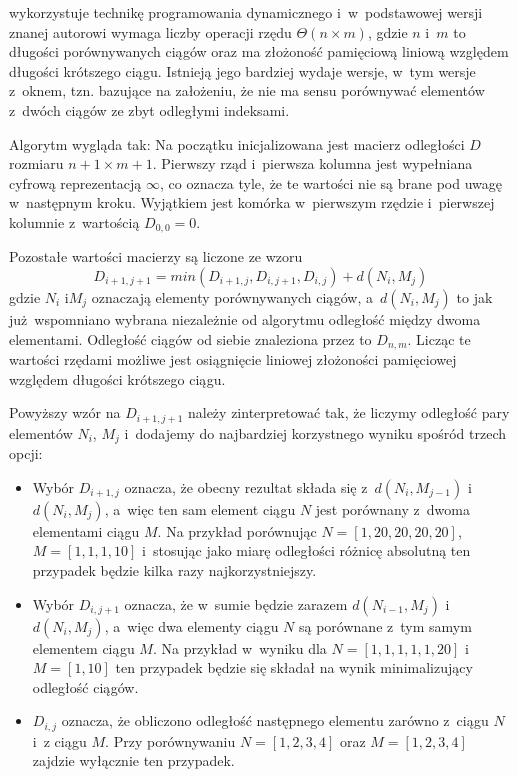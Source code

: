  wykorzystuje technikę programowania dynamicznego i~w~podstawowej wersji znanej autorowi wymaga liczby operacji
rzędu $\Theta(n \times m)$, gdzie $n$ i~$m$ to długości porównywanych ciągów oraz ma złożoność pamięciową liniową
względem długości krótszego ciągu. Istnieją jego bardziej wydaje wersje, w~tym wersje z~oknem, tzn. bazujące na
założeniu, że nie ma sensu porównywać elementów z~dwóch ciągów ze zbyt odległymi indeksami.

Algorytm wygląda tak: Na początku inicjalizowana jest macierz odległości $D$ rozmiaru $n + 1 \times m + 1$. Pierwszy
rząd i~pierwsza kolumna jest wypełniana cyfrową reprezentacją $\infty$, co oznacza tyle,
że te wartości nie są brane pod uwagę w~następnym kroku.
Wyjątkiem jest komórka w~pierwszym rzędzie i~pierwszej kolumnie z~wartością $D_{0,0} = 0$.

Pozostałe wartości macierzy są liczone ze wzoru
$$D_{i+1, j+1} = min(D_{i+1, j}, D_{i, j+1}, D_{i, j}) + d(N_i, M_j)$$
gdzie $N_i$ i$M_j$ oznaczają elementy porównywanych ciągów, a~$d(N_i, M_j)$ to jak już wspomniano wybrana
niezależnie od algorytmu odległość między dwoma elementami. Odległość ciągów od siebie znaleziona przez 
to $D_{n, m}$.  Licząc te wartości rzędami możliwe jest osiągnięcie liniowej złożoności pamięciowej względem
długości krótszego ciągu.

Powyższy wzór na $D_{i+1, j+1}$ należy zinterpretować tak, że liczymy odległość pary elementów $N_i$, $M_j$ i~dodajemy
do najbardziej korzystnego wyniku spośród trzech opcji:

\begin{itemize}
    \item Wybór $D_{i+1, j}$ oznacza, że obecny rezultat składa się z~$d(N_i, M_{j-1})$ i~$d(N_i, M_j)$, a~więc ten sam element ciągu $N$ jest porównany z~dwoma elementami ciągu $M$. Na przykład porównując $N = [1, 20, 20, 20, 20]$, $M = [1, 1, 1, 10]$ i~stosując jako miarę odległości różnicę absolutną ten przypadek będzie kilka razy najkorzystniejszy.
    \item Wybór $D_{i, j+1}$ oznacza, że w~sumie będzie zarazem $d(N_{i-1}, M_j)$ i~$d(N_i, M_j)$, a~więc dwa elementy ciągu $N$ są porównane z~tym samym elementem ciągu $M$. Na przykład w~wyniku dla $N = [1, 1, 1, 1, 1, 20]$ i~$ M = [1, 10]$ ten przypadek będzie się składał na wynik minimalizujący odległość ciągów.
    \item $D_{i, j}$ oznacza, że obliczono odległość następnego elementu zarówno z~ciągu $N$ i~z ciągu $M$. Przy porównywaniu $N = [1, 2, 3, 4]$ oraz $M = [1, 2, 3, 4]$ zajdzie wyłącznie ten przypadek.
\end{itemize}

